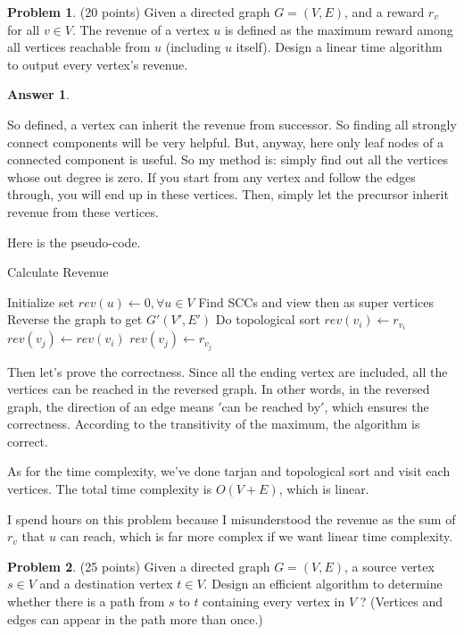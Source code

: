 \documentclass{article}
\theoremstyle{definition}
\newtheorem{prob}{Problem}
\newtheorem{ans}{Answer}
\begin{document}
\begin{prob}
	(20 points) Given a directed graph $G=(V, E)$, and a reward $r_{v}$ for all $v \in V$. The revenue of a vertex $u$ is defined as the maximum reward among all vertices reachable from $u$ (including $u$ itself). Design a linear time algorithm to output every vertex's revenue.
\end{prob}
\begin{ans}
	~
	
	So defined, a vertex can inherit the revenue from successor. So finding all strongly connect components will be very helpful. But, anyway, here only leaf nodes of a connected component is useful. So my method is: simply find out all the vertices whose out degree is zero. If you start from any vertex and follow the edges through, you will end up in these vertices. Then, simply let the precursor inherit revenue from these vertices.
	
	Here is the pseudo-code.
	
	\begin{algorithm}
		\caption{Calculate Revenue}
		\BlankLine
		Initialize set $rev(u) \gets 0, \forall u \in V$\;
		Find SCCs and view then as super vertices\;
		Reverse the graph to get $G'(V',E')$\;
		Do topological sort\;
		{
			$rev(v_i)\gets r_{v_i}$\;
			{
				{$rev(v_j)\gets rev(v_i)$\;}
				{$rev(v_j)\gets r_{v_j}$}
			}
		}
	\end{algorithm}

	Then let's prove the correctness. Since all the ending vertex are included, all the vertices can be reached in the reversed graph. In other words, in the reversed graph, the direction of an edge means $'$can be reached by$'$, which ensures the correctness. According to the transitivity of the maximum, the algorithm is correct. 
	
	As for the time complexity, we've done tarjan and topological sort and visit each vertices. The total time complexity is $O(V+E)$, which is linear.
	
	I spend hours on this problem because I misunderstood the revenue as the sum of $r_v$ that $u$ can reach, which is far more complex if we want linear time complexity.
\end{ans}
\begin{prob}
	(25 points) Given a directed graph $G=(V, E)$, a source vertex $s \in V$ and a destination vertex $t \in V$. Design an efficient algorithm to determine whether there is a path from $s$ to $t$ containing every vertex in $V$ ? (Vertices and edges can appear in the path more than once.)
\end{prob}
\end{document}
